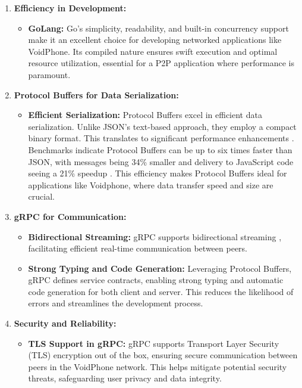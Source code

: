 \begin{enumerate}
    \item \textbf{Efficiency in Development:}
    \begin{itemize}
        \item \textbf{GoLang:} Go's simplicity, readability, and built-in concurrency support make it an excellent choice for developing networked applications like VoidPhone. Its compiled nature ensures swift execution and optimal resource utilization, essential for a P2P application where performance is paramount.
    \end{itemize}
    
    \item \textbf{Protocol Buffers for Data Serialization:}
    \begin{itemize}
        \item \textbf{Efficient Serialization:} Protocol Buffers excel in efficient data serialization. Unlike JSON's text-based approach, they employ a compact binary format. This translates to significant performance enhancements \parencite{hardwareAcceleratorProtocolBuffers}. Benchmarks indicate Protocol Buffers can be up to six times faster than JSON, with messages being 34\% smaller and delivery to JavaScript code seeing a 21\% speedup \parencite{beatingJSONWithProtobuf}. This efficiency makes Protocol Buffers ideal for applications like Voidphone, where data transfer speed and size are crucial.
    \end{itemize}
    
    \item \textbf{gRPC for Communication:}
    \begin{itemize}
        \item \textbf{Bidirectional Streaming:} gRPC supports bidirectional streaming \parencite{grpcCoreConcepts}, facilitating efficient real-time communication between peers.
        \item \textbf{Strong Typing and Code Generation:} Leveraging Protocol Buffers, gRPC defines service contracts, enabling strong typing and automatic code generation for both client and server. This reduces the likelihood of errors and streamlines the development process.
    \end{itemize}
    
    \item \textbf{Security and Reliability:}
    \begin{itemize}
        \item \textbf{TLS Support in gRPC:} gRPC supports Transport Layer Security (TLS) encryption out of the box, ensuring secure communication between peers in the VoidPhone network. This helps mitigate potential security threats, safeguarding user privacy and data integrity.
    \end{itemize}
\end{enumerate}

